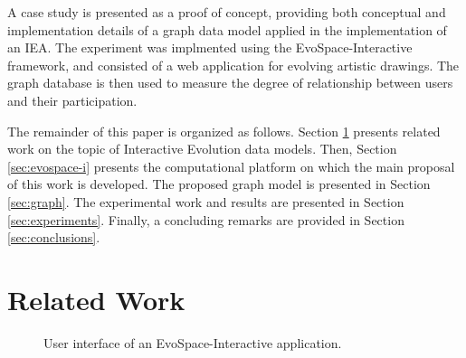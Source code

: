 \documentclass[conference]{IEEEtran}
\begin{document}
A case study is presented as a proof of concept, providing both
conceptual and implementation details of a graph data model applied in the 
implementation of an IEA. The experiment was implmented using
the EvoSpace-Interactive framework, and consisted of a web application
for evolving artistic drawings. The graph database is then used to
measure the degree of relationship between users and their participation.  

The remainder of this paper is organized as follows.
Section \ref{sec:interactive} presents related work on the topic 
of Interactive Evolution data models.
Then, Section \ref{sec:evospace-i} presents the computational platform on which 
the main proposal of this work is developed. The proposed graph model is 
presented in Section \ref{sec:graph}.
The experimental work and results are presented in Section \ref{sec:experiments}.
Finally, a concluding remarks are provided in Section \ref{sec:conclusions}.


\section{Related Work}
\label{sec:interactive}


\begin{figure}
\captionsetup{justification=centering,margin=2cm}
\centering
\setlength\fboxsep{0pt}
\setlength\fboxrule{0.7pt}
\caption{User interface of an EvoSpace-Interactive application.}
\label{fig:web}       
\end{figure}
\end{document}
